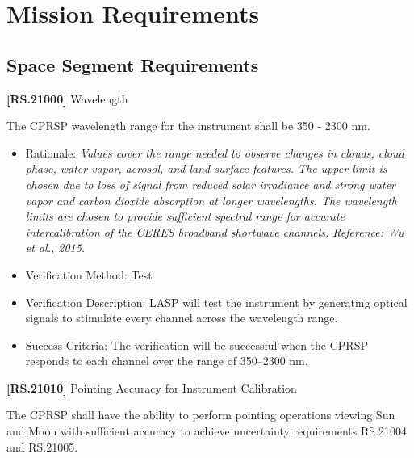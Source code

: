 \documentclass[12pt,oneside,oldfontcommands]{memoir}
\begin{document}
\section{Mission Requirements}
\label{missionrequirements}

\subsection{Space Segment Requirements}
\label{spacesegmentrequirements}

\textbf{[RS.21000]} Wavelength

The \gls{CPRSP} wavelength range for the instrument shall be 350 - 2300 nm.

\begin{itemize}
\item{} Rationale: \emph{Values cover the range needed to observe changes in clouds, cloud phase, water vapor, aerosol, and land surface features. The upper limit is chosen due to loss of signal from reduced solar irradiance and strong water vapor and carbon dioxide absorption at longer wavelengths. The wavelength limits are chosen to provide sufficient spectral range for accurate intercalibration of the CERES broadband shortwave channels. Reference: Wu et al., 2015.}

\item{} Verification Method: Test

\item{} Verification Description: \gls{LASP} will \gls{test} the instrument by generating optical signals to stimulate every channel across the wavelength range.

\item{} Success Criteria: The verification will be successful when the \gls{CPRSP} responds to each channel over the range of 350--2300 nm.

\end{itemize}

\textbf{[RS.21010]} Pointing Accuracy for Instrument Calibration

The \gls{CPRSP} shall have the ability to perform \gls{point}ing operations viewing Sun and Moon with sufficient accuracy to achieve uncertainty requirements \gls{RS}.21004 and \gls{RS}.21005.
\end{document}
